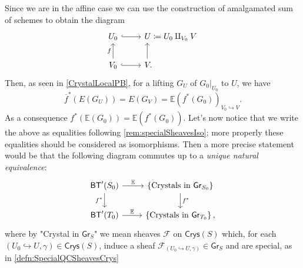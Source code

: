\begin{rem}
	Since we are in the affine case we can use the construction of amalgamated
	sum of schemes to obtain the diagram
	\begin{equation*}
	\begin{tikzcd}[/tikz/column 2/.append style={anchor=base west}]
		U_0 \arrow[r, "", hookrightarrow] &
		U \coloneqq U_0 \amalg_{V_0} V \\
		V_0 \arrow[u, "f", rightarrow] 
		\arrow[r, "", hookrightarrow] &
		V \arrow[u, "", rightarrow, end anchor={[xshift=1.84ex,yshift=0.29ex]south west},
		start anchor={[xshift=0.38ex]}] 
	.\end{tikzcd}
	\end{equation*}
	Then, as seen in \cref{CrystalLocalPB}, for a lifting $G_U$ 
	of $\left.G_0\right|_{U_0}$ to $U$, we have
	\begin{equation*}
		\overline{f}^* \left( E(G_U) \right) =
		E(G_V) = \mathbb{E} \left( f^* (G_0) \right)_{V_0 \hookrightarrow V}
	.\end{equation*}
	As a consequence $f^* \left( \mathbb{E}(G_0) \right) =
	\mathbb{E}\left( f^*(G_0) \right)$.
	Let's now notice that we write the above as equalities following \cref{rem:specialSheavesIso};
	more properly these equalities should be considered as isomorphisms.
	Then a more precise statement would be that the following diagram
	commutes up to a {\em unique natural equivalence}:
	\begin{equation*}
	\begin{tikzcd}
		\mathsf{BT}'(S_0)
		\arrow[r, "\mathbb{E}", rightarrow] 
		\arrow[d, "f^*"', rightarrow] &
		\left\{ \text{Crystals in } \mathsf{Gr}_{S_0} \right\}
		\arrow[d, "f^*", rightarrow] \\
		\mathsf{BT}'(T_0) \arrow[r, "\mathbb{E}", rightarrow] &
		\left\{ \text{Crystals in } \mathsf{Gr}_{T_0} \right\}
	,\end{tikzcd}
	\end{equation*}
	where by "Crystal in $\mathsf{Gr}_S$" we mean sheaves $\mathscr{F}$ on $\mathsf{Crys}(S)$
	which, for each $\left(U_0 \hookrightarrow U, \gamma\right) \in \mathsf{Crys}(S)$,
	induce a sheaf $\mathscr{F}_{\left(U_0 \hookrightarrow U, \gamma\right)} \in \mathsf{Gr}_S$
	and are special, as in \cref{defn:SpecialQCSheavesCrys}
\end{rem}


